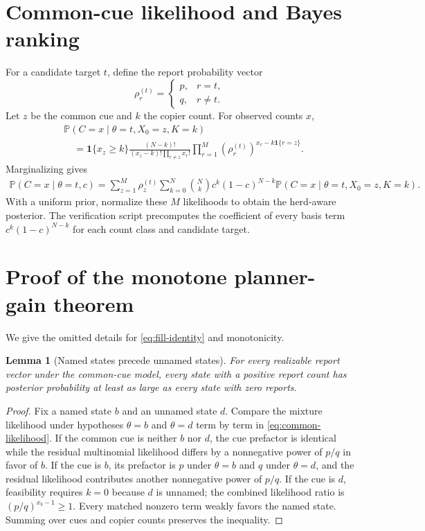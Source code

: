 \documentclass[11pt]{article}
\newtheorem{lemma}{Lemma}
\theoremstyle{definition}
\theoremstyle{remark}
\newcommand{\Prob}{\mathbb{P}}
\newcommand{\1}{\mathbf{1}}
\begin{document}
\section{Common-cue likelihood and Bayes ranking}
\label{app:likelihood}

For a candidate target $t$, define the report probability vector
\[
\rho_r^{(t)}=
\begin{cases}
p,&r=t,\\q,&r\neq t.
\end{cases}
\]
Let $z$ be the common cue and $k$ the copier count. For observed counts $x$,
\begin{align}
&\Prob(C=x\mid\theta=t,X_0=z,K=k)\\
&\quad=
\1\{x_z\ge k\}
\frac{(N-k)!}{(x_z-k)!\prod_{r\neq z}x_r!}
\prod_{r=1}^M\left(\rho_r^{(t)}\right)^{x_r-k\1\{r=z\}}.
\end{align}
Marginalizing gives
\begin{align}
\Prob(C=x\mid\theta=t,c)
=\sum_{z=1}^M\rho_z^{(t)}
\sum_{k=0}^N\binom Nk c^k(1-c)^{N-k}
\Prob(C=x\mid\theta=t,X_0=z,K=k).
\label{eq:common-likelihood}
\end{align}
With a uniform prior, normalize these $M$ likelihoods to obtain the herd-aware posterior. The verification script precomputes the coefficient of every basis term $c^k(1-c)^{N-k}$ for each count class and candidate target.

\section{Proof of the monotone planner-gain theorem}
\label{app:planner-proof}

We give the omitted details for \cref{eq:fill-identity} and monotonicity.

\begin{lemma}[Named states precede unnamed states]
For every realizable report vector under the common-cue model, every state with a positive report count has posterior probability at least as large as every state with zero reports.
\end{lemma}

\begin{proof}
Fix a named state $b$ and an unnamed state $d$. Compare the mixture likelihood under hypotheses $\theta=b$ and $\theta=d$ term by term in \cref{eq:common-likelihood}. If the common cue is neither $b$ nor $d$, the cue prefactor is identical while the residual multinomial likelihood differs by a nonnegative power of $p/q$ in favor of $b$. If the cue is $b$, its prefactor is $p$ under $\theta=b$ and $q$ under $\theta=d$, and the residual likelihood contributes another nonnegative power of $p/q$. If the cue is $d$, feasibility requires $k=0$ because $d$ is unnamed; the combined likelihood ratio is $(p/q)^{x_b-1}\ge1$. Every matched nonzero term weakly favors the named state. Summing over cues and copier counts preserves the inequality.
\end{proof}
\end{document}
